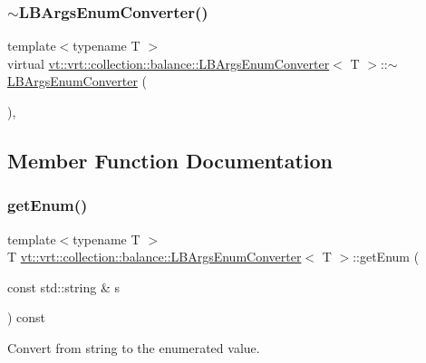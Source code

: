 \subsubsection{\texorpdfstring{$\sim$\+L\+B\+Args\+Enum\+Converter()}{~LBArgsEnumConverter()}}
{\footnotesize\ttfamily template$<$typename T $>$ \\
virtual \hyperlink{structvt_1_1vrt_1_1collection_1_1balance_1_1_l_b_args_enum_converter}{vt\+::vrt\+::collection\+::balance\+::\+L\+B\+Args\+Enum\+Converter}$<$ T $>$\+::$\sim$\hyperlink{structvt_1_1vrt_1_1collection_1_1balance_1_1_l_b_args_enum_converter}{L\+B\+Args\+Enum\+Converter} (\begin{DoxyParamCaption}{ }\end{DoxyParamCaption})\hspace{0.3cm}{\ttfamily [virtual]}, {\ttfamily [default]}}



\subsection{Member Function Documentation}
\mbox{\label{structvt_1_1vrt_1_1collection_1_1balance_1_1_l_b_args_enum_converter_aea2a93bc866e73a7d39d4b858d0738d3}} 
\subsubsection{\texorpdfstring{get\+Enum()}{getEnum()}}
{\footnotesize\ttfamily template$<$typename T $>$ \\
T \hyperlink{structvt_1_1vrt_1_1collection_1_1balance_1_1_l_b_args_enum_converter}{vt\+::vrt\+::collection\+::balance\+::\+L\+B\+Args\+Enum\+Converter}$<$ T $>$\+::get\+Enum (\begin{DoxyParamCaption}\item[{const std\+::string \&}]{s }\end{DoxyParamCaption}) const\hspace{0.3cm}{\ttfamily [inline]}}



Convert from string to the enumerated value. 

